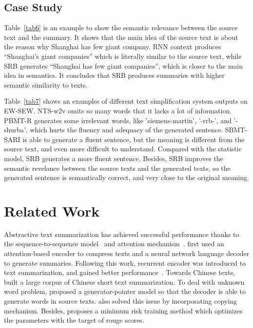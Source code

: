 \documentclass{clv3}
\begin{document}
\begin{CJK*}{UTF8}{gbsn}
\subsection{Case Study}

Table~\ref{tab6} is an example to show the semantic relevance between the source text and the summary. It shows that the main idea of the source text is
about the reason why Shanghai has few giant company. RNN context produces ``Shanghai's giant companies'' which is literally similar to the source text, while
SRB generates ``Shanghai has few giant companies'', which is closer to the main idea in semantics. It concludes that SRB produces summaries with higher
semantic similarity to texts.

Table~\ref{tab7} shows an examples of different text simplification system outputs on EW-SEW. NTS-w2v omits so many words that it lacks a lot of information. PBMT-R generates some irrelevant words, like 'siemens-martin', '-rrb-', and '-shurba', which hurts the fluency and adequacy of the generated sentence. SBMT-SARI is able to generate a fluent sentence, but the meaning is different from the source text, and even more difficult to understand.
Compared with the statistic model, SRB generates a more fluent sentence. Besides, SRB improves the semantic revelance between the source texts and the generated texts, so the generated sentence is semantically correct, and very close to the original meaning.

\section{Related Work}


Abstractive text summarization has achieved successful performance thanks to the sequence-to-sequence model~\cite{seq2seq} and attention mechanism~\cite{attention}.
 first used an attention-based encoder to compress texts and a neural network language decoder to generate summaries.
Following this work, recurrent encoder was introduced to text summarization, and gained better performance~\cite{rnnheadline,ras}. Towards Chinese texts, 
built a large corpus of Chinese short text summarization. To deal with unknown word problem,  proposed a generator-pointer model
so that the decoder is able to generate words in source texts.  also solved this issue by incorporating copying mechanism.
Besides,  proposes a minimum risk training method which optimizes the parameters with the target of rouge scores.


\end{CJK*}
\end{document}
